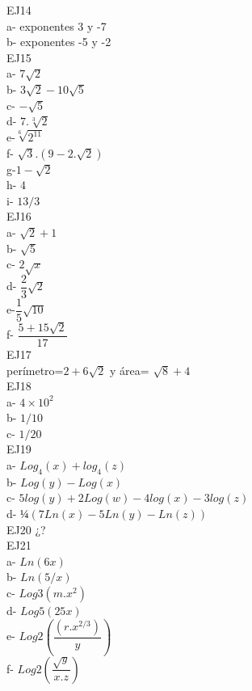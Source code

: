 \documentclass[12pt,a4paper]{article}
\begin{document}
EJ14\\
a- exponentes 3 y -7\\
b- exponentes -5 y -2\\
EJ15\\
a-	$7\sqrt{2}$ \\
b- $3\sqrt{2}-10\sqrt{5}$\\
c- $-\sqrt{5}$\\
d- $7.\sqrt[3]{2}$\\
e-$ \sqrt[6]{2^{11}}$\\
f- $\sqrt{3}.(9-2.\sqrt{2})$\\
g-$1-\sqrt{2}$\\
h- $ 4$\\
i- $13/3 $\\
EJ16\\
a-	$\sqrt{2}+ 1$ \\
b- $\sqrt{5} $ \\
c- $ 2\sqrt{x}$ \\
d- $\dfrac{2}{3}\sqrt{2} $ \\
e-$\dfrac{1}{5}\sqrt{10} $ \\
f- $ \dfrac{5+15\sqrt{2}}{17}$ \\
EJ17\\
perímetro=$2+6\sqrt{2}$ y área= $\sqrt{8}+4$\\
EJ18\\
a-	$4\times10^{2}$\\
b-	$1/10$\\
c-	$1/20$\\
EJ19\\
a-	$Log_{4}(x)+log_{4}(z)$\\
b-	$Log(y)-Log(x)$\\
c-	$5log(y)+2Log(w)-4log(x)-3log(z)$\\
d-	$¼(7Ln(x)-5Ln(y)-Ln(z))$\\
EJ20 ¿?\\
EJ21\\
a-	$Ln(6x)$\\
b-	$Ln(5/x)$\\
c-	$Log3(m.x^{2})$\\
d-	$Log5(25x)$\\
e-	$Log2(\dfrac{(r.x^{2/3})}{y})$\\
f-	$Log2(\dfrac{\sqrt{y}}{x.z})$\\
\end{document}
